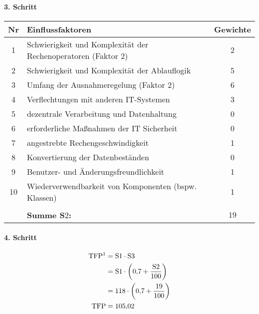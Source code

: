 \begin{landscape}
\begin{minipage}{0.7\textwidth}
		\paragraph{3. Schritt}
		\begin{center}
			\begin{tabular}{|c|l|c|}
				\hline
				Nr & Einflussfaktoren & Gewichte\\
				\hline
				1 & Schwierigkeit und Komplexität der Rechenoperatoren (Faktor 2) & 2\\
				2 & Schwierigkeit und Komplexität der Ablauflogik & 5\\
				3 & Umfang der Ausnahmeregelung (Faktor 2) & 6\\
				4 & Verflechtungen mit anderen IT-Systemen & 3\\
				5 & dezentrale Verarbeitung und Datenhaltung & 0\\
				6 & erforderliche Maßnahmen der IT Sicherheit & 0\\
				7 & angestrebte Rechengeschwindigkeit & 1\\
				8 & Konvertierung der Datenbeständen & 0\\
				9 & Benutzer- und Änderungsfreundlichkeit & 1\\
				10 & Wiederverwendbarkeit von Komponenten (bspw. Klassen) & 1\\
				\hline
				\multicolumn{3}{c}{}\\
				\cline{2-3}
			    \multicolumn{1}{c}{} & \multicolumn{1}{|l|}{{\bf Summe S$2$:}} & $19$\\
				\cline{2-3} 
			\end{tabular}
		\end{center}
	\end{minipage}
\end{landscape}
\paragraph{4. Schritt}
\begin{align*}
	\text{TFP\footnotemark} &= \text{S}1 \cdot \text{S}3\\
			   &= \text{S}1 \cdot \left(0{,}7 + \frac{\text{S}2}{100}\right)\\
			   &= 118 \cdot \left( 0{,}7 + \frac{19}{100}\right)\\
	\text{TFP} &= 105{,}02\\
\end{align*}
